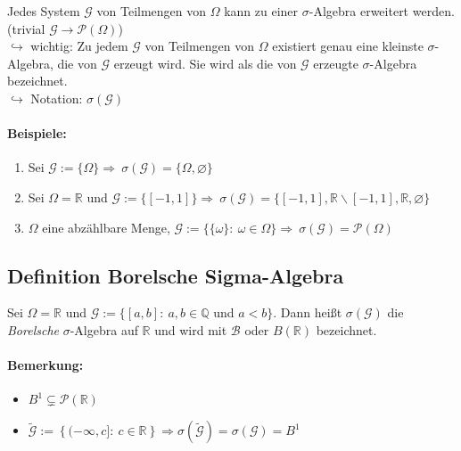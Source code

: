 \documentclass[12pt,a4paper]{article}
\begin{document}
	Jedes System $\mathcal{G}$ von Teilmengen von $\Omega$ kann zu einer $\sigma$-Algebra erweitert werden. (trivial $\mathcal{G}\rightarrow\mathcal{P}(\Omega)$)\\
	$\hookrightarrow$ wichtig: Zu jedem $\mathcal{G}$ von Teilmengen von $\Omega$ existiert genau eine kleinste $\sigma$-Algebra, die von $\mathcal{G}$ erzeugt wird.	Sie wird als die von $\mathcal{G}$ erzeugte $\sigma$-Algebra bezeichnet. \\
	$\hookrightarrow$ Notation: $\sigma(\mathcal{G})$
	
	\paragraph{Beispiele:}
	\begin{enumerate}
	\label{enum10.1}
		\item Sei $\mathcal{G}:=\{\Omega\}\Rightarrow \: \sigma(\mathcal{G})=\{\Omega,\varnothing\}$
		\item Sei $\Omega=\mathbb{R}$ und $\mathcal{G}:=\{[-1,1]\}\Rightarrow\: \sigma(\mathcal{G})=\{[-1,1],\mathbb{R}\backslash [-1,1],\mathbb{R},\varnothing\}$
		\item $\Omega$ eine abzählbare Menge, $\mathcal{G}:=\{\{\omega\}:\: \omega\in\Omega\}\Rightarrow \: \sigma(\mathcal{G})=\mathcal{P}(\Omega)$
	\end{enumerate}
	
	\subsection{Definition Borelsche Sigma-Algebra}
	\label{defBorelsch}
	Sei $\Omega = \mathbb{R}$ und $\displaystyle \mathcal{G}:=\{[a,b]: \: a,b\in\mathbb{Q}$ und $a<b\}$. Dann heißt $\sigma (\mathcal{G})$ die \textit{Borelsche} $\sigma $-Algebra auf $\mathbb{R}$ und wird mit $\mathcal{B}$ oder $B(\mathbb{R})$ bezeichnet.	
	
	\paragraph{Bemerkung:}
	\begin{itemize}
		\item $\displaystyle B^1 \subsetneq \mathcal{P}(\mathbb{R})$
		\item $\displaystyle \tilde{\mathcal{G}}:= \left\{(-\infty,c]: \: c\in\mathbb{R}\right\} \Rightarrow \sigma(\tilde{\mathcal{G}})=\sigma(\mathcal{G})=B^1$
	\end{itemize}
	
\end{document}
